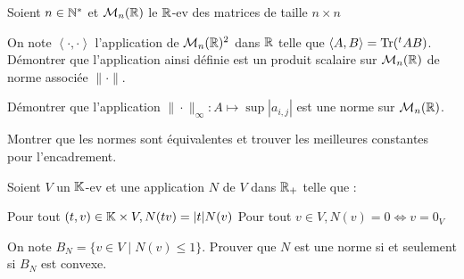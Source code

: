 \documentclass{report}
\begin{document}
\begin{exo}
    Soient \(n\in\mathbb{N}^*\) et \(\mathcal{M}_n(\mathbb{R})\) le \(\mathbb{R}\)-ev des matrices de taille \(n\times n\)
    \begin{q}{1}
        On note \(\left\langle\cdot,\cdot\right\rangle\) l'application de \(\mathcal{M}_n(\mathbb{R})^2\)
        dans \(\mathbb{R}\) telle que \(\langle A,B\rangle=\operatorname{Tr}(^tAB)\). Démontrer que l'application
        ainsi définie est un produit scalaire sur \(\mathcal{M}_n(\mathbb{R})\) de norme associée \(\|\cdot\|\).
    \end{q}
    \begin{q}{2}
        Démontrer que l'application \(\|\cdot\|_\infty : A \mapsto \sup |a_{i,j}|\)
        est une norme sur \(\mathcal{M}_n(\mathbb{R})\).
    \end{q}
    \begin{q}{3}
        Montrer que les normes sont équivalentes et trouver les meilleures constantes pour l'encadrement.
    \end{q}
\end{exo}

\begin{exo}
    Soient \(V\) un \(\mathbb{K}\)-ev et une application \(N\) de \(V\) dans \(\mathbb{R}_+\) telle que :
    \begin{enumerate}
        \itt Pour tout \(\left(t,v\right)\in\mathbb{K}\times V, N(tv)=|t|N(v)\)
        \itt Pour tout \(v\in V, N(v)=0 \Leftrightarrow v = 0_V\)
    \end{enumerate}
    On note \(B_N = \{v\in V\mid N(v)\leq 1\}\). Prouver que \(N\) est une norme si et seulement si \(B_N\) est convexe.
\end{exo}
\end{document}
